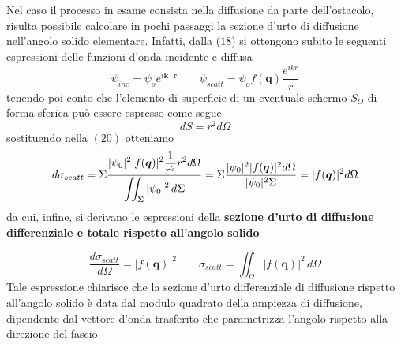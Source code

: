 Nel caso il processo in esame consista nella diffusione da parte dell'ostacolo, risulta possibile calcolare in pochi passaggi la sezione d'urto di diffusione nell'angolo solido elementare.
Infatti, dalla ($18$) si ottengono subito le seguenti espressioni delle funzioni d'onda incidente e diffusa \[
	\psi_{inc} = \psi_o e^{i \bm{k} \cdot \bm{r}} \qquad
	\psi_{scatt} = \psi_o f(\bm{q})\frac{e^{ikr}}{r}
\] tenendo poi conto che l'elemento di superficie di un eventuale schermo $S_O$ di forma sferica può essere espresso come segue \[
	dS = r^2 d \Omega
\] sostituendo nella $(20)$ otteniamo \[
	d \sigma_{scatt} = \Sigma \fraclarg{|\psi_0|^2|f(\bm{q})|^2\frac{1}{r^2}r^2 d \Omega}{\iint_{\Sigma}|\psi_0|^2 \, d \Sigma}
	= \Sigma \frac{|\psi_0|^2|f(\bm{q})|^2 d \Omega}{|\psi_0|^2 \Sigma}
	= |f(\bm{q})|^2 d \Omega
\]
da cui, infine, si derivano le espressioni della \textbf{sezione d'urto di diffusione differenziale e totale rispetto all'angolo solido}

\begin{equation}
	\frac{d \sigma_{scatt}}{d \Omega} = |f(\bm{q})|^2 \qquad
	\sigma_{scatt} = \iint_{\Omega}|f(\bm{q})|^2 \, d \Omega
\end{equation}
Tale espressione chiarisce che la sezione d'urto differenziale di diffusione rispetto all'angolo solido è data dal modulo quadrato della ampiezza di diffusione, dipendente dal vettore d'onda trasferito che parametrizza l'angolo rispetto alla direzione del fascio.

